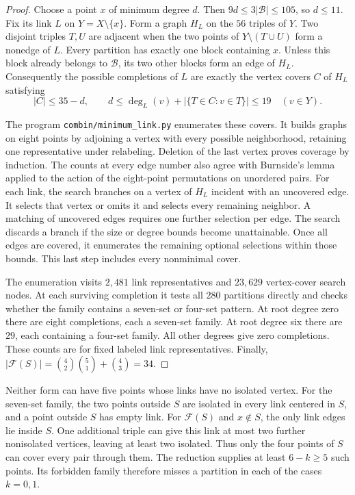 \documentclass[11pt]{article}
\begin{document}
\begin{proof}
Choose a point $x$ of minimum degree $d$. Then $9d\le3|\mathcal B|\le105$,
so $d\le11$. Fix its link $L$ on $Y=X\setminus\{x\}$. Form a graph $H_L$
on the $56$ triples of $Y$. Two disjoint triples $T,U$ are adjacent when
the two points of $Y\setminus(T\cup U)$ form a nonedge of $L$. Every
partition has exactly one block containing $x$. Unless this block already
belongs to $\mathcal B$, its two other blocks form an edge of $H_L$.
Consequently the possible completions of $L$ are exactly the vertex covers
$C$ of $H_L$ satisfying
\[
  |C|\le35-d,\qquad
  d\le\deg_L(v)+|\{T\in C:v\in T\}|\le19\quad(v\in Y).
\]

The program \texttt{combin/minimum\_link.py} enumerates these covers.
It builds graphs on eight points by adjoining a vertex with every possible
neighborhood, retaining one representative under relabeling. Deletion of the
last vertex proves coverage by induction. The counts at every edge number
also agree with Burnside's lemma applied to the action of the eight-point
permutations on unordered pairs. For each link, the search branches on a
vertex of $H_L$ incident with an uncovered edge. It selects that vertex or
omits it and selects every remaining neighbor. A matching of uncovered
edges requires one further selection per edge. The search discards a
branch if the size or degree bounds become unattainable. Once all edges are
covered, it enumerates the remaining optional selections within those bounds.
This last step includes every nonminimal cover.

The enumeration visits $2{,}481$ link representatives and $23{,}629$
vertex-cover search nodes. At each surviving completion it tests all $280$
partitions directly and checks whether the family contains a seven-set or
four-set pattern. At root degree zero there are eight completions, each a
seven-set family. At root degree six there are $29$, each containing a
four-set family. All other degrees give zero completions. These counts are
for fixed labeled link representatives. Finally,
$|\mathcal F(S)|=\binom42\binom51+\binom43=34$.
\end{proof}

Neither form can have five points whose links have no isolated vertex.
For the seven-set family, the two points outside $S$ are isolated in every
link centered in $S$, and a point outside $S$ has empty link.
For $\mathcal F(S)$ and $x\notin S$,
the only link edges lie inside $S$. One additional triple can give this link
at most two further nonisolated vertices, leaving at least two isolated.
Thus only the four points of $S$ can cover every pair through them.
The reduction supplies at least $6-k\ge5$ such points. Its forbidden family
therefore misses a partition in each of the cases $k=0,1$.
\end{document}
